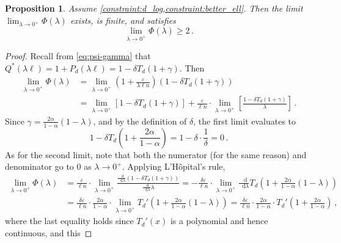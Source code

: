 \documentclass[10pt,a4paper]{article}
\newtheorem{proposition}{Proposition}[section]
\newcommand{\odif}{\mathop{}\!\mathrm{d}} %
\renewcommand{\epsilon}{\varepsilon}
\begin{document}
\begin{proposition}
    \label{res:phi-limit-0}
    Assume \cref{constraint:d_log,constraint:better_ell}. Then the limit $\lim_{\lambda \to 0^+}
    \Phi(\lambda)$ exists, is finite, and satisfies
    \begin{equation}
        \label{eq:phi-lb}
        \lim_{\lambda \to 0^+} \Phi(\lambda) \ge 2 \,.
    \end{equation}
\end{proposition}
\begin{proof}
    Recall from \cref{eq:psi-gamma} that $Q^*(\lambda \ell) = 1 + P_d(\lambda \ell) = 1 -
    \delta T_d(1 + \gamma)$. Then 
    \begin{align*}
        \lim_{\lambda \to 0^+} \Phi(\lambda)
        &= \lim_{\lambda \to 0^+}
            \left(1 + \frac{\epsilon}{\lambda \ell n}\right)
            \left(1 - \delta T_d(1 + \gamma)\right) \\
        &= \lim_{\lambda \to 0^+} \left[ 1 - \delta T_d(1 + \gamma) \right]
            + \frac{\epsilon}{\ell n} \cdot \lim_{\lambda \to 0^+} \left[
                \frac{1 - \delta T_d(1 + \gamma)}{\lambda} \right] \,.
    \end{align*}
    Since $\gamma = \frac{2\alpha}{1-\alpha}(1-\lambda)$, and by the definition of $\delta$, the
    first limit evaluates to
    \[
        1 - \delta T_d\left(1 + \frac{2\alpha}{1-\alpha}\right) = 1 - \delta \cdot \frac{1}{\delta}
        = 0 \,.
    \]
    As for the second limit, note that both the numerator (for the same reason) and denominator go
    to $0$ as $\lambda \to 0^+$. Applying L'Hôpital's rule,
    \begin{align*}
        \lim_{\lambda \to 0^+} \Phi(\lambda)
        &= \frac{\epsilon}{\ell n} \cdot \lim_{\lambda \to 0^+}
        \frac{\frac{\odif}{\odif \lambda} (1 - \delta T_d(1 + \gamma))}
             {\frac{\odif}{\odif \lambda} \lambda}
        = -\frac{\delta \epsilon}{\ell n} \cdot \lim_{\lambda \to 0^+}
            \frac{\odif}{\odif \lambda} T_d\left(1 + \frac{2\alpha}{1-\alpha}(1-\lambda)\right) \\
        &= \frac{\delta \epsilon}{\ell n} \cdot \frac{2\alpha}{1-\alpha} \cdot
            \lim_{\lambda \to 0^+} T_d'\left(1 + \frac{2\alpha}{1-\alpha}(1-\lambda)\right)
        = \frac{\delta \epsilon}{\ell n} \cdot \frac{2\alpha}{1-\alpha} \cdot
            T_d'\left(1 + \frac{2\alpha}{1-\alpha}\right) \,,
    \end{align*}
    where the last equality holds since $T_d'(x)$ is a polynomial and hence continuous, and this

\end{proof}
\end{document}
